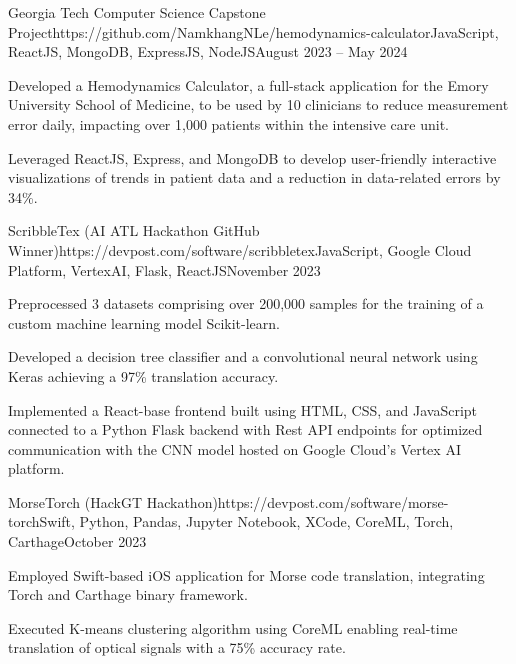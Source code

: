 \documentclass{article}
\begin{document}
\begin{flushleft}
    \begin{project}{Georgia Tech Computer Science Capstone Project}{https://github.com/NamkhangNLe/hemodynamics-calculator}{JavaScript, ReactJS, MongoDB, ExpressJS, NodeJS}{August 2023 -- May 2024}
        \item Developed a Hemodynamics Calculator, a full-stack application for the Emory University School of Medicine, to be used by 10 clinicians to reduce measurement error daily, impacting over 1,000 patients within the intensive care unit.
        \item Leveraged ReactJS, Express, and MongoDB to develop user-friendly interactive visualizations of trends in patient data and a reduction in data-related errors by 34\%.
    \end{project}

    \begin{project}{ScribbleTex (AI ATL Hackathon GitHub Winner)}{https://devpost.com/software/scribbletex}{JavaScript, Google Cloud Platform, VertexAI, Flask, ReactJS}{November 2023}
        \item Preprocessed 3 datasets comprising over 200,000 samples for the training of a custom machine learning model Scikit-learn.
        \item Developed a decision tree classifier and a convolutional neural network using Keras achieving a 97\% translation accuracy.
        \item Implemented a React-base frontend built using HTML, CSS, and JavaScript connected to a Python Flask backend with Rest API endpoints for optimized communication with the CNN model hosted on Google Cloud's Vertex AI platform.
    \end{project}

    \begin{project}{MorseTorch (HackGT Hackathon)}{https://devpost.com/software/morse-torch}{Swift, Python, Pandas, Jupyter Notebook, XCode, CoreML, Torch, Carthage}{October 2023}
        \item Employed Swift-based iOS application for Morse code translation, integrating Torch and Carthage binary framework.
        \item Executed K-means clustering algorithm using CoreML enabling real-time translation of optical signals with a 75\% accuracy rate.
        
    \end{project}



\end{flushleft}
\end{document}
